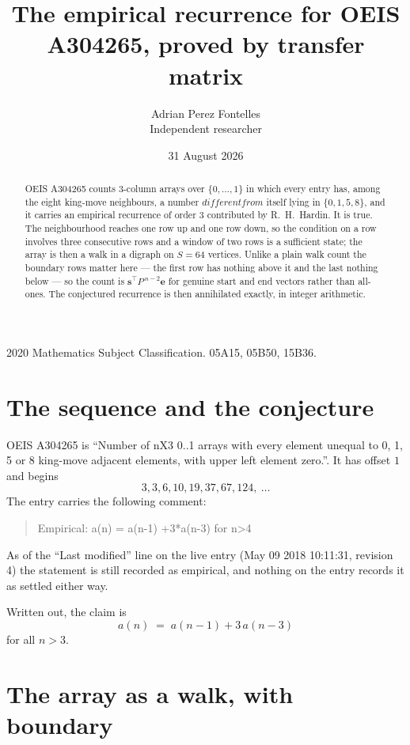 \documentclass[11pt,a4paper]{article}
\title{The empirical recurrence for OEIS A304265, proved by transfer matrix}
\author{Adrian Perez Fontelles\\ \small Independent researcher}
\date{31 August 2026}
\theoremstyle{plain}
\theoremstyle{definition}
\begin{document}
\maketitle

\begin{abstract}
OEIS A304265 counts $3$-column arrays over $\{0,\dots,1\}$ in which every entry has,
among the eight king-move neighbours, a number $different from$ itself lying in $\{0,1,5,8\}$, and it carries an empirical
recurrence of order $3$ contributed by R.~H.~Hardin. It is true. The neighbourhood
reaches one row up and one row down, so the condition on a row involves three consecutive
rows and a window of two rows is a sufficient state; the array is then a walk in a digraph
on $S=64$ vertices. Unlike a plain walk count the boundary rows matter here --- the first
row has nothing above it and the last nothing below --- so the count is
$\mathbf{s}^{\!\top}P^{\,n-2}\mathbf{e}$ for genuine start and end vectors rather than
all-ones. The conjectured recurrence is then annihilated exactly, in integer arithmetic.
\end{abstract}

\noindent\small 2020 Mathematics Subject Classification. 05A15, 05B50, 15B36.\normalsize

\section{The sequence and the conjecture}

OEIS A304265 is ``Number of nX3 0..1 arrays with every element unequal to 0, 1, 5 or 8 king-move adjacent elements, with upper left element zero.''. It has offset
$1$ and begins
\[
3, 3, 6, 10, 19, 37, 67, 124,\ \dots
\]
The entry carries the following comment:
\begin{quote}\small
Empirical: a(n) = a(n-1) +3*a(n-3) for n>4
\end{quote}
As of the ``Last modified'' line on the live entry (May 09 2018 10:11:31, revision
4) the statement is still recorded as empirical, and nothing on the entry
records it as settled either way.

Written out, the claim is
\begin{equation}\label{eq:conj}
a(n)\;=\;a(n-1) + 3\,a(n-3)
\end{equation}
for all $n>3$.

\section{The array as a walk, with boundary}
\end{document}
